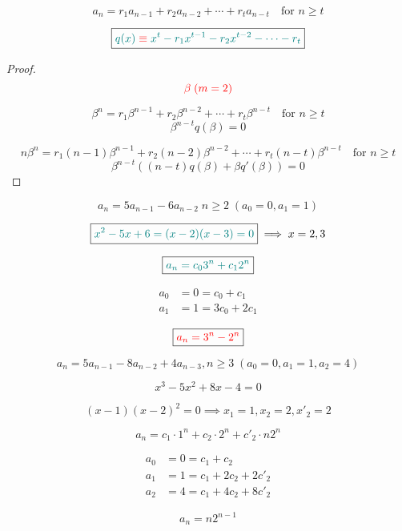 \begin{frame}{}
  \[
    a_n = r_1 a_{n-1} + r_2 a_{n-2} + \cdots + r_t a_{n-t} \quad \text{for } n \ge t
  \]

  \[
    \boxed{\textcolor{teal}{q(x) \;\textcolor{red}{\equiv}\; x^t - r_1 x^{t-1} - r_2 x^{t-2} - \cdots - r_t}}
  \]

  \pause
  \begin{proof}
    \[
      \textcolor{red}{\beta \; (m = 2)}
    \]

    \pause
    \[
      \beta^n = r_1 \beta^{n-1} + r_2 \beta^{n-2} + \cdots + r_t \beta^{n-t} \quad \text{for } n \ge t
    \]
    \pause
    \vspace{-0.50cm}
    \[
      \beta^{n-t} q(\beta) = 0
    \]

    \pause
    \vspace{-0.50cm}
    \[
      n\beta^{n} = r_1 (n-1) \beta^{n-1} + r_2 (n-2) \beta^{n-2} + \cdots + r_t (n-t) \beta^{n-t} \quad \text{for } n \ge t
    \]
    \pause
    \vspace{-0.50cm}
    \[
      \beta^{n-t} \left(\left(n-t\right)q(\beta) + \beta q'(\beta)\right) = 0
    \]
  \end{proof}
\end{frame}

\begin{frame}{}
  \[
    a_n = 5a_{n-1} - 6a_{n-2} \; n \ge 2 \; (a_0 = 0, a_1 = 1)
  \]

  \pause
  \[
    \boxed{\textcolor{teal}{x^2 - 5x + 6 = (x-2) (x-3) = 0}} \implies x = 2, 3
  \]

  \pause
  \[
    \boxed{\textcolor{teal}{a_n = c_0 3^n + c_1 2^n}}
  \]
  
  \pause
  \begin{align*}
    a_0 &= 0 = c_0 + c_1 \\
    a_1 &= 1 = 3c_0 + 2c_1
  \end{align*}

  \pause
  \[
    \boxed{\textcolor{red}{a_n = 3^n - 2^n}}
  \]
\end{frame}

\begin{frame}{}
  \[
    a_n = 5 a_{n-1} - 8 a_{n-2} + 4 a_{n-3}, n \ge 3 \; (a_0 = 0, a_1 = 1, a_2 = 4)
  \]

  \pause
  \[
    \boxed{x^3 - 5 x^2 + 8 x - 4 = 0}
  \]

  \pause
  \[
    (x-1) (x-2)^2 = 0 \implies x_1 = 1, x_{2} = 2, x'_{2} = 2
  \]

  \pause
  \[
    a_n = c_1 \cdot 1^{n} + c_{2} \cdot 2^{n} + c'_{2} \cdot n 2^{n}
  \]

  \pause
  \vspace{-0.30cm}
  \begin{align*}
    a_0 &= 0 = c_1 + c_2 \\
    a_1 &= 1 = c_1 + 2c_2 + 2c'_{2} \\
    a_2 &= 4 = c_1 + 4c_2 + 8c'_{2}
  \end{align*}

  \pause
  \[
    \boxed{a_n = n 2^{n-1}}
  \]
\end{frame}

